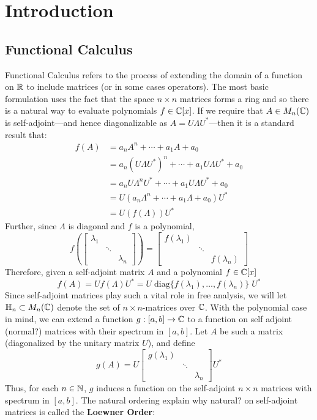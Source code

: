 \chapter{Introduction}\label{ch:introduction}

\section{Functional Calculus}%
\label{sec:functionalcalc}

Functional Calculus refers to the process of extending the domain of a function
on \(\mathbb{R}\) to include matrices (or in some cases operators). The most basic
formulation uses the fact that the space \(n \times n\) matrices forms a ring
and so there is a natural way to evaluate polynomials \(f \in \mathbb{C} [x]\). If we
require that $A \in M_n(\mathbb{C})$ is self-adjoint---and hence diagonalizable as
$A = U \Lambda U^*$---then it is a standard result that:
\begin{align*}
  f(A) &= a_nA^n + \cdots + a_1A + a_0 \\
  &= a_n \left( U\Lambda U^* \right) ^n + \cdots + a_1 U\Lambda U^* + a_0 \\
  &= a_n U\Lambda^n U^* + \cdots + a_1 U\Lambda U^* + a_0 \\
  &= U \left( a_n\Lambda ^n + \cdots + a_1\Lambda + a_0 \right) U^* \\
  &= U \left( f(\Lambda) \right) U^*
\end{align*}
Further, since \(\Lambda\) is diagonal and $f$ is a polynomial,
\[
  f \left( \begin{bmatrix} \lambda_1 &  &  \\  & \ddots &  \\  &  & \lambda_n \end{bmatrix}  \right)
  = \begin{bmatrix} f(\lambda_1) &  &  \\  & \ddots &  \\  &  & f(\lambda_n) \end{bmatrix}
\]
Therefore, given a self-adjoint matrix \(A\) and a polynomial \(f \in \mathbb{C} [x]\)
\[
  f(A) = Uf(\Lambda)U^* = U \;\text{diag}\{f(\lambda_{1}), \dots , f(\lambda_n)\} \; U^*
\]
Since self-adjoint matrices play such a vital role in free analysis, we will let
\(\mathbb{H}_n \subset M_n(\mathbb{C})\) denote the set of \(n \times n\)-matrices over \(\mathbb{C} \).
With the polynomial case in mind, we can extend a function \(g: [a,b] \to \mathbb{C} \)
to a function on self adjoint {\color{red} (normal?)} matrices with their
spectrum in \([a,b]\). Let \(A\) be such a matrix (diagonalized by the unitary
matrix \(U\)), and define
\[
  g(A) = U
  \begin{bmatrix} g(\lambda_1) & &\\ &\ddots& \\ & & \lambda_n \end{bmatrix}
  U^*
\]
Thus, for each \(n \in \mathbb{N} \), \(g\) induces a function on the self-adjoint
\(n \times n\) matrices with spectrum in \([a,b]\).  The natural ordering
{\color{red} {explain why natural?}} on self-adjoint matrices is called the
\textbf{Loewner Order}:

